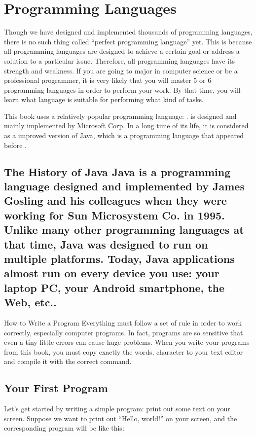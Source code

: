 \documentclass[../main.tex]{subfiles}
\begin{document}
    \section{Programming Languages}
    Though we have designed and implemented thousands of programming languages,
    there is no such thing called ``perfect programming language'' yet. This is
    because all programming languages are designed to achieve a certain goal or
    address a solution to a particular issue. Therefore, all programming languages
    have its strength and weakness. If you are going to major in computer science or
    be a professional programmer, it is very likely that you will master 5 or 6
    programming languages in order to perform your work. By that time, you will
    learn what language is suitable for performing what kind of tasks.

    This book uses a relatively popular programming language: \csharp. \csharp is
    designed and mainly implemented by Microsoft Corp. In a long time of its
    life, it is considered as a improved version of Java, which is a programming
    language that appeared before \csharp.

    \subsection{The History of Java
    Java is a programming language designed and implemented by James Gosling and his
    colleagues when they were working for Sun Microsystem Co. in 1995. Unlike many
    other programming languages at that time, Java was designed to run on multiple
    platforms. Today, Java applications almost run on every device you use: your
    laptop PC, your Android smartphone, the Web, etc..}

    How to Write a \csharp Program
    Everything must follow a set of rule in order to work correctly, especially
    computer programs. In fact, programs are so sensitive that even a tiny little
    errors can cause huge problems. When you write your programs from this book,
    you must copy exactly the words, character to your text editor and compile it
    with the correct command.

    \subsection{Your First \csharp Program}
    Let's get started by writing a simple \csharp program: print out some text on
    your screen. Suppose we want to print out ``Hello, world!'' on your screen, and
    the corresponding program will be like this:
\end{document}
